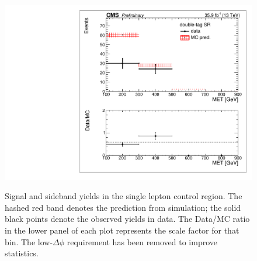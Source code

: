 \begin{figure}[hb!]
\includegraphics[trim={5px 5px 5px 5px},clip,width=0.425\linewidth]{figs/ABCDscaleFactors_MET_double-tagSR_lowDeltaPhi_singleLep.pdf}\\
\caption{
Signal and sideband \ptmiss yields in the single lepton control region. The hashed red band denotes the prediction from simulation; the solid black points denote the observed yields in data. The Data/MC ratio in the lower panel of each plot represents the scale factor for that bin. The low-$\Delta\phi$ requirement has been removed to improve statistics.
}
\label{fig:closuresinglelep}
\end{figure}


